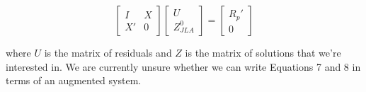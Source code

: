 \documentclass[12pt]{article}
\begin{document}
\begin{equation}
  \begin{bmatrix}
I & X \\
X' & 0  
\end{bmatrix}  \begin{bmatrix} U \\ Z_{JLA}^0 \end{bmatrix} = \begin{bmatrix} R_p' \\ 0 \end{bmatrix}
\label{aug:JLA1}
\end{equation}

\noindent where $U$ is the matrix of residuals and $Z$ is the matrix of solutions that we're interested in. We are currently unsure whether we can write Equations 7 and 8 in terms of an augmented system.
\end{document}
